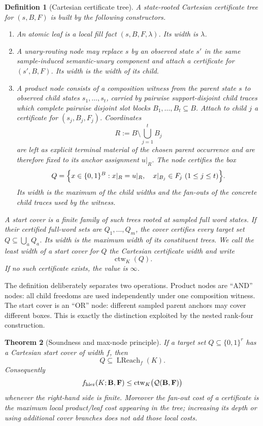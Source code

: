 \documentclass[11pt]{article}
\newtheorem{definition}{Definition}[section]
\newtheorem{theorem}[definition]{Theorem}
\begin{document}
\begin{definition}[Cartesian certificate tree]
\label{def:cartesian-certificate-tree}
A \emph{state-rooted Cartesian certificate tree} for $(s,B,F)$ is built by the
following constructors.
\begin{enumerate}[label=\textup{(T\arabic*)},leftmargin=*]
\item An \emph{atomic leaf} is a local fill fact $(s,B,F,\lambda)$.
Its width is $\lambda$.
\item A \emph{unary-routing node} may replace $s$ by an observed state $s'$ in
the same sample-induced semantic-unary component and attach a certificate for
$(s',B,F)$.  Its width is the width of its child.
\item A \emph{product node} consists of a composition witness
from the parent state $s$ to observed child states $s_1,\ldots,s_t$, carried by
pairwise support-disjoint child traces which complete pairwise disjoint slot
blocks $B_1,\ldots,B_t\subseteq B$.  Attach to child $j$ a certificate for
$(s_j,B_j,F_j)$.  Coordinates
\[
  R:=B\setminus\bigcup_{j=1}^{t}B_j
\]
are left as explicit terminal material of the chosen parent occurrence and are
therefore fixed to its anchor assignment $u|_R$.  The node certifies the box
\[
 Q=\Bigl\{x\in\{0,1\}^{B}:
      x|_R=u|_R,\quad x|_{B_j}\in F_j\ (1\le j\le t)\Bigr\}.
\]
Its width is the maximum of the child widths and the fan-outs of the concrete
child traces used by the witness.
\end{enumerate}
A \emph{start cover} is a finite family of such trees rooted at sampled full
word states.  If their certified full-word sets are $Q_1,\ldots,Q_m$, the cover
certifies every target set $Q\subseteq\bigcup_aQ_a$.  Its width is the maximum
width of its constituent trees.  We call the least width of a start cover for
$Q$ the \emph{Cartesian certificate width} and write
\[
  \operatorname{ctw}_K(Q).
\]
If no such certificate exists, the value is $\infty$.
\end{definition}

The definition deliberately separates two operations.  Product nodes are
``AND'' nodes: all child freedoms are used independently under one composition
witness.  The start cover is an ``OR'' node: different sampled parent anchors
may cover different boxes.  This is exactly the distinction exploited by the
nested rank-four construction.

\begin{theorem}[Soundness and max-node principle]
\label{thm:certificate-tree-soundness}
If a target set $Q\subseteq\{0,1\}^r$ has a Cartesian start cover of width
$f$, then
\[
  \boxed{Q\subseteq\operatorname{LReach}_f(K).}
\]
Consequently
\[
  f_{\rm hier}(K;\mathbf B,\mathbf F)
  \le
  \operatorname{ctw}_K\bigl(\mathcal Q(\mathbf B,\mathbf F)\bigr)
\]
whenever the right-hand side is finite.  Moreover the fan-out cost of a
certificate is the \emph{maximum} local product/leaf cost appearing in the
tree; increasing its depth or using additional cover branches does not add
those local costs.
\end{theorem}
\end{document}
